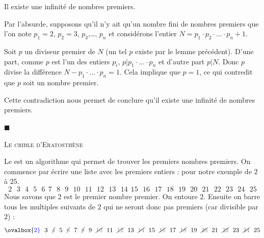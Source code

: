 \begin{proposition}
Il existe une infinité de nombres premiers.
\end{proposition}


Par l'absurde, supposons qu'il n'y ait qu'un nombre fini de nombres premiers que l'on note
$p_1=2$, $p_2=3$, $p_3$,\ldots, $p_n$ et considérons l'entier $N=p_1\cdot p_2\cdot \ldots \cdot p_n+ 1$.

\smallskip
Soit $p$ un diviseur premier de $N$ (un tel $p$ existe par le lemme précédent). D'une part, comme  $p$ est l'un des entiers $p_i$, $p | p_1\cdot \ldots \cdot p_n$ et d'autre part $p|N$. Donc $p$ divise la différence $N-p_1\cdot \ldots \cdot p_n=1$.
Cela implique que $p=1$, ce qui contredit que $p$ soit un nombre premier.

Cette contradiction nous permet de conclure qu'il existe une infinité de nombres premiers.

\hfill $\blacksquare$

\bigskip

\newcommand{\entourer}[1]{\ovalbox{\color{blue}#1}}
\newcommand{\barrer}[1]{{\cancel{\color{gray} #1}}}
\centerline{\textsc{Le crible d'Eratosthène}}

\bigskip
Le  est un algorithme qui permet de trouver les premiers nombres premiers.
On commence par écrire une liste avec les premiers entiers : pour notre exemple de $2$ à $25$.
$$2\ \ \ 3\ \ \ 4\ \ \ 5\ \ \ 6\ \ 7\ \ \ 8\ \ \ 9\ \ \ 10\ \ \ 11\ \ \ 12\ \ \ 13\ \ \ 14\ \ 15\ \
\ 16\ \ \ 17\ \ \ 18\ \ \ 19\ \ \ 20\ \ \ 21\ \ \ 22\ \ \ 23\ \ \ 24\ \ \ 25$$
Nous savons que $2$ est le premier nombre premier.
On entoure $2$. Ensuite on barre
 tous les multiples suivants de $2$ qui ne seront donc pas premiers
(car divisible par $2$) :
$$\entourer{2}\ \ 3\ \ \barrer{4}\ \ 5\ \ \barrer{6}\ \ 7\ \ \barrer{8}\ \ 9\ \ \barrer{10}\ \ 11\ \ \barrer{12}\ \
13\ \ \barrer{14}\ \ 15\ \
\barrer{16}\ \ 17\ \ \barrer{18}\ \ 19\ \ \barrer{20}\ \ 21\ \ \barrer{22}\ \ 23\ \ \barrer{24}\ \ 25$$

